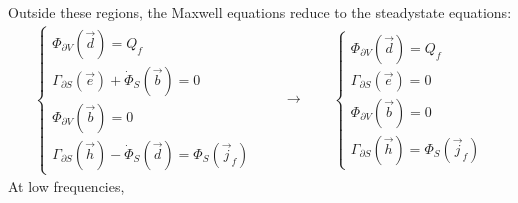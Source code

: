 \documentclass[letterpaper,10pt,english]{jupyterBook}
\begin{document}
\sphinxAtStartPar
Outside these regions, the Maxwell equations  reduce to the steady\sphinxhyphen{}state equations:
\begin{equation}\label{equation:ch/circuits-electric-components:eq:principles:maxwell:el-circuit}
\begin{split}\begin{cases}
  \Phi_{\partial V}(\vec{d}) = Q_f \\
  \Gamma_{\partial S}(\vec{e}) + \dot{\Phi}_S(\vec{b}) = 0 \\
  \Phi_{\partial V}(\vec{b}) = 0 \\
  \Gamma_{\partial S}(\vec{h}) - \dot{\Phi}_S(\vec{d}) = \Phi_S(\vec{j}_f)
\end{cases}
\qquad \rightarrow \qquad
\begin{cases}
  \Phi_{\partial V}(\vec{d}) = Q_f \\
  \Gamma_{\partial S}(\vec{e}) = 0 \\
  \Phi_{\partial V}(\vec{b}) = 0 \\
  \Gamma_{\partial S}(\vec{h}) = \Phi_S(\vec{j}_f)
\end{cases}\end{split}
\end{equation}
\sphinxAtStartPar
At low frequencies,
\end{document}
